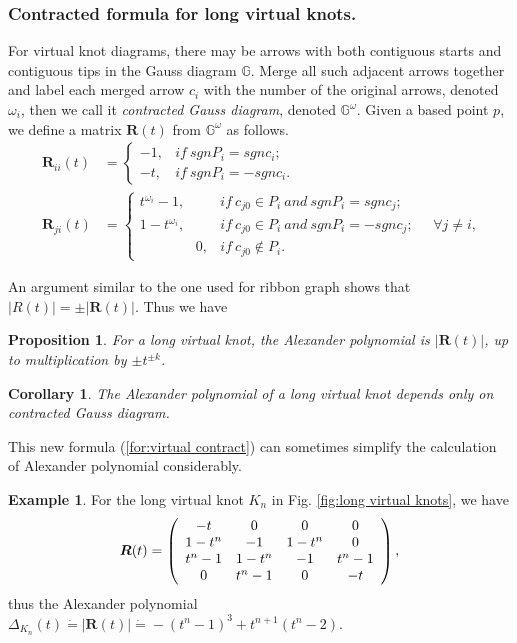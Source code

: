 \documentclass{amsart}
\newtheorem{cor}[thm]{Corollary}
\newtheorem{prop}[thm]{Proposition}
\theoremstyle{definition}
\newtheorem{example}[thm]{Example}
\theoremstyle{remark}
\numberwithin{equation}{subsection}
\begin{document}
\subsubsection{Contracted formula for long virtual knots.}
For virtual knot diagrams, there may be arrows with both contiguous starts and contiguous tips in the Gauss diagram $\mathbb{G}$. Merge all such adjacent arrows together and label each merged arrow $c_{i}$ with the number of the original arrows, denoted $\omega_{i}$, then we call it \emph{contracted Gauss diagram}, denoted $\mathbb{G}^{\omega}$. Given a based point $p$, we define a matrix $\boldsymbol{R}(t)$ from $\mathbb{G}^{\omega}$ as follows.
\begin{align}
\boldsymbol{R}_{ii}(t) &=\begin{cases}-1,&if\ \textit{sgn}P_{i}=\textit{sgn}c_{i};\\ -t,&if\ \textit{sgn}P_{i}=-\textit{sgn}c_{i}.\end{cases} \nonumber\\
\boldsymbol{R}_{ji}(t)&=\begin{cases}t^{\omega_{i}}-1,&if\ c_{j0}\in P_{i}\ and\ \textit{sgn}P_{i}=\textit{sgn}c_{j};\\ 1-t^{\omega_{i}},&if\ c_{j0}\in P_{i}\ and\ \textit{sgn}P_{i}=-\textit{sgn}c_{j};\\ \qquad\qquad 0,&if\ c_{j0}\notin P_{i}.\end{cases}\quad\forall j\neq i, \label{for:virtual contract}
\end{align}

An argument similar to the one used for ribbon graph shows that $|R(t)|=\pm|\boldsymbol{R}(t)|$. Thus we have 
\begin{prop}
    For a long virtual knot, the Alexander polynomial is $ |\boldsymbol{R}(t)| $, up to multiplication by $\pm t^{\pm k}$.
\end{prop}

\begin{cor}
The Alexander polynomial of a long virtual knot depends only on contracted Gauss diagram.
\end{cor}

This new formula (\ref{for:virtual contract}) can sometimes simplify the calculation of Alexander polynomial considerably.

\begin{example}
For the long virtual knot $K_{n}$ in Fig. \ref{fig:long virtual knots}, we have
\begin{align}
    \boldsymbol{R}(t)=\left(\begin{array}[]{cccc}-t&0&0&0\\ 1-t^{n}&-1&1-t^{n}&0\\ t^{n}-1&1-t^{n}&-1&t^{n}-1\\ 0&t^{n}-1&0&-t\end{array}\right),
\end{align}
thus the Alexander polynomial $ \Delta_{K_{n}}(t)\dot{=} |\boldsymbol{R}(t)|\dot{=}-(t^{n}-1)^{3}+t^{n+1}(t^{n}-2)$. 
\end{example}
\end{document}
